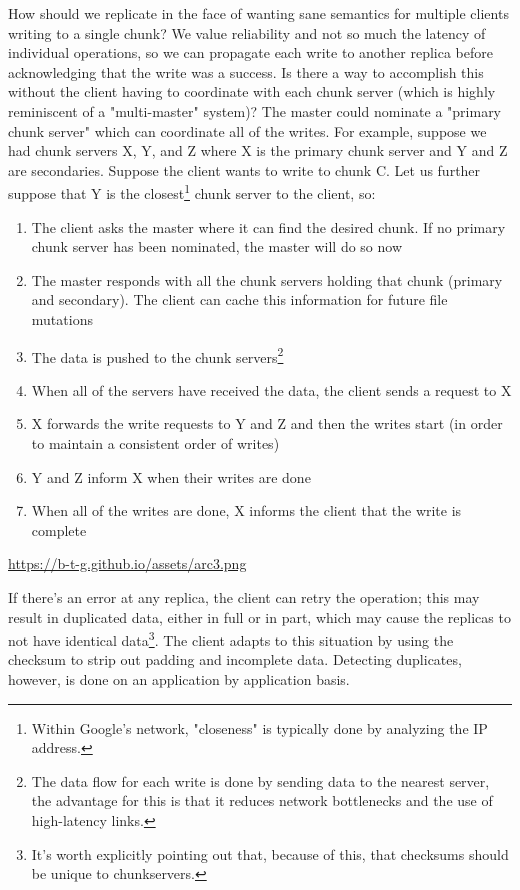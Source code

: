 \documentclass[11pt]{article}
\begin{document}
How should we replicate in the face of wanting sane semantics for multiple clients writing to a single chunk?
We value reliability and not so much the latency of individual operations, so we can propagate each write to another replica before acknowledging that the write was a success.
Is there a way to accomplish this without the client having to coordinate with each chunk server (which is highly reminiscent of a "multi-master" system)?
The master could nominate a "primary chunk server" which can coordinate all of the writes. For example, suppose we had chunk servers X, Y, and Z where X is the primary chunk server and Y and
Z are secondaries. Suppose the client wants to write to chunk C. Let us further suppose that Y is the closest\footnote{Within Google's network, "closeness" is typically done by analyzing the IP address.} chunk server to the client, so:
\begin{enumerate}
\item The client asks the master where it can find the desired chunk. If no primary chunk server has been nominated, the master will do so now
\item The master responds with all the chunk servers holding that chunk (primary and secondary). The client can cache this information for future file mutations
\item The data is pushed to the chunk servers\footnote{The data flow for each write is done by sending data to the nearest server, the advantage for this is that it reduces network bottlenecks and the use of high-latency links.}
\item When all of the servers have received the data, the client sends a request to X
\item X forwards the write requests to Y and Z and then the writes start (in order to maintain a consistent order of writes)
\item Y and Z inform X when their writes are done
\item When all of the writes are done, X informs the client that the write is complete
\end{enumerate}

\url{https://b-t-g.github.io/assets/arc3.png}

If there's an error at any replica, the client can retry the operation; this may result in duplicated data, either in full or in part, which may cause the replicas to not have identical data\footnote{It's worth explicitly pointing out that, because of this, that checksums should be unique to chunkservers.}.
The client adapts to this situation by using the checksum to strip out padding and incomplete data. Detecting duplicates, however, is done on an application by application basis.
\end{document}
